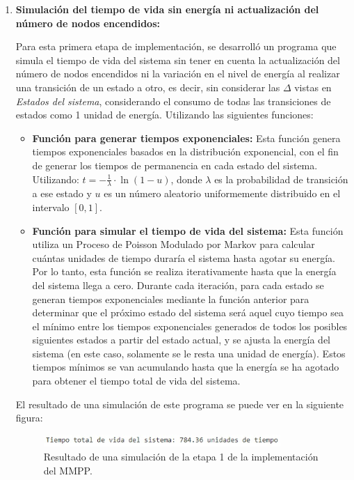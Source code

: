 \begin{enumerate}[label=\arabic*.]

\item \textbf{Simulación del tiempo de vida sin energía ni actualización del número de nodos encendidos:}

Para esta primera etapa de implementación, se desarrolló un programa que simula el tiempo de vida del sistema sin tener en cuenta la actualización del número de nodos encendidos ni la variación en el nivel de energía al realizar una transición de un estado a otro, es decir, sin considerar las $\Delta$ vistas en \textit{Estados del sistema}, considerando el consumo de todas las transiciones de estados como 1 unidad de energía. Utilizando las siguientes funciones:

\begin{itemize}
    \item \textbf{Función para generar tiempos exponenciales:} Esta función genera tiempos exponenciales basados en la distribución exponencial, con el fin de generar los tiempos de permanencia en cada estado del sistema. Utilizando: $ t = -\frac{1}{\lambda} \cdot \ln(1-u)$, donde $\lambda$ es la probabilidad de transición a ese estado y $u$ es un número aleatorio uniformemente distribuido en el intervalo $[0, 1]$.

    \item \textbf{Función para simular el tiempo de vida del sistema:} Esta función utiliza un Proceso de Poisson Modulado por Markov para calcular cuántas unidades de tiempo duraría el sistema hasta agotar su energía. Por lo tanto, esta función se realiza iterativamente hasta que la energía del sistema llega a cero. Durante cada iteración, para cada estado se generan tiempos exponenciales mediante la función anterior para determinar que el próximo estado del sistema será aquel cuyo tiempo sea el mínimo entre los tiempos exponenciales generados de todos los posibles siguientes estados a partir del estado actual, y se ajusta la energía del sistema (en este caso, solamente se le resta una unidad de energía). Estos tiempos mínimos se van acumulando hasta que la energía se ha agotado para obtener el tiempo total de vida del sistema.
\end{itemize}

El resultado de una simulación de este programa se puede ver en la siguiente figura:

\begin{figure}[H]
    \centering
    \includegraphics[width=0.85\textwidth, height=0.04\textheight]{imagenes/mmpp1.1.jpg}
    \caption{Resultado de una simulación de la etapa 1 de la implementación del MMPP.}
\end{figure}


\end{enumerate}
